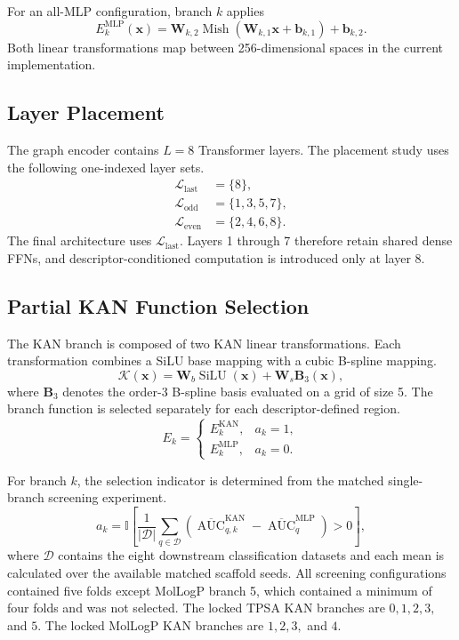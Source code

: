 \documentclass[journal=jcisd8,manuscript=article]{achemso}
\begin{document}
For an all-MLP configuration, branch \(k\) applies
\begin{equation}
E^{\mathrm{MLP}}_k(\mathbf{x})
=
\mathbf{W}_{k,2}
\operatorname{Mish}
\left(\mathbf{W}_{k,1}\mathbf{x}+\mathbf{b}_{k,1}\right)
+\mathbf{b}_{k,2}.
\end{equation}
Both linear transformations map between 256-dimensional spaces in the
current implementation.

\subsection{Layer Placement}

The graph encoder contains \(L=8\) Transformer layers. The placement study
uses the following one-indexed layer sets.
\begin{align}
\mathcal{L}_{\mathrm{last}} &= \{8\},\\
\mathcal{L}_{\mathrm{odd}} &= \{1,3,5,7\},\\
\mathcal{L}_{\mathrm{even}} &= \{2,4,6,8\}.
\end{align}
The final architecture uses \(\mathcal{L}_{\mathrm{last}}\). Layers 1 through
7 therefore retain shared dense FFNs, and descriptor-conditioned computation
is introduced only at layer 8.

\subsection{Partial KAN Function Selection}

The KAN branch is composed of two KAN linear transformations. Each
transformation combines a SiLU base mapping with a cubic B-spline mapping.
\begin{equation}
\mathcal{K}(\mathbf{x})
=
\mathbf{W}_{b}\operatorname{SiLU}(\mathbf{x})
+
\mathbf{W}_{s}\mathbf{B}_{3}(\mathbf{x}),
\end{equation}
where \(\mathbf{B}_{3}\) denotes the order-3 B-spline basis evaluated on a
grid of size 5. The branch function is selected separately for each
descriptor-defined region.
\begin{equation}
E_k=
\begin{cases}
E_k^{\mathrm{KAN}}, & a_k=1,\\
E_k^{\mathrm{MLP}}, & a_k=0.
\end{cases}
\label{eq:partial-kan}
\end{equation}

For branch \(k\), the selection indicator is determined from the matched
single-branch screening experiment.
\begin{equation}
a_k
=
\mathbb{I}
\left[
\frac{1}{|\mathcal{D}|}
\sum_{q\in\mathcal{D}}
\left(
\overline{\operatorname{AUC}}_{q,k}^{\mathrm{KAN}}
-
\overline{\operatorname{AUC}}_{q}^{\mathrm{MLP}}
\right)
>0
\right],
\label{eq:kan-selection}
\end{equation}
where \(\mathcal{D}\) contains the eight downstream classification datasets
and each mean is calculated over the available matched scaffold seeds. All
screening configurations contained five folds except MolLogP branch 5, which
contained a minimum of four folds and was not selected. The locked TPSA KAN
branches are \(0,1,2,3,\) and \(5\). The locked MolLogP KAN branches are
\(1,2,3,\) and \(4\).
\end{document}
